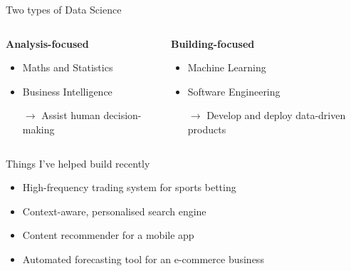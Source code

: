 \documentclass[12pt,aspectratio=169]{beamer}
\begin{document}
\begin{frame}{Two types of Data Science}
    \begin{columns}
        \begin{column}{0.5\textwidth}
            \begin{center}
                \large\bf%
                Analysis\hyp{}focused
            \end{center}
            \begin{itemize}
                \item Maths and Statistics
                \item Business Intelligence
                \item[$\to$] Assist human decision\hyp{}making
            \end{itemize}
        \end{column}
        \begin{column}{0.5\textwidth}
            \begin{center}
                \large\bf%
                Building\hyp{}focused
            \end{center}
            \begin{itemize}
                \item Machine Learning
                \item Software Engineering
                \item[$\to$] Develop and deploy data\hyp{}driven products
            \end{itemize}
        \end{column}
    \end{columns}
\end{frame}

\begin{frame}{Things I've helped build recently}
    \begin{itemize}
        \setlength{\itemsep}{\bigskipamount}%
        \item High\hyp{}frequency trading system for sports betting
        \item Context\hyp{}aware, personalised search engine
        \item Content recommender for a mobile app
        \item Automated forecasting tool for an e\hyp{}commerce business
    \end{itemize}
\end{frame}
\end{document}
